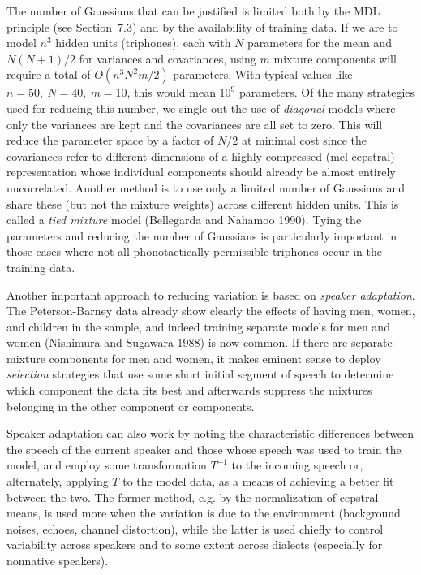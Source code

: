 The number of Gaussians that can be justified is limited both by the MDL
principle (see Section~7.3) and by the availability of training data. If we
are to model $n^3$ hidden units (triphones), each with $N$ parameters for the
mean and $N(N+1)/2$ for variances and covariances, using $m$ mixture
components will require a total of $O(n^3N^2m/2)$ parameters. With typical
values like $n=50,\ N=40,\ m=10$, this would mean $10^9$ parameters. Of the
many strategies used for reducing this number, we single out the use of {\it
  diagonal} models where only the variances are kept and the covariances are
all set to zero. This will reduce the
parameter space by a factor of $N/2$ at minimal cost since the covariances
refer to different dimensions of a highly compressed (mel cepstral)
representation whose individual components should already be almost entirely
uncorrelated. Another method is to use only a limited number of Gaussians and
share these (but not the mixture weights) across different hidden units. This
is called a {\it tied mixture} model (Bellegarda and Nahamoo
1990).\nocite{Bellegarda:1990}
Tying the parameters and reducing the number of Gaussians is particularly
important in those cases where not all phonotactically permissible triphones
occur in the training data.

Another important approach to reducing variation is based on {\it speaker
  adaptation}. The Peterson-Barney data already show clearly the effects of
having men, women, and children in the sample, and indeed training separate
models for men and women (Nishimura and Sugawara 1988) is now
common.\nocite{Nishimura:1988} If there are separate mixture components for
men and women, it makes eminent sense to deploy {\it selection} strategies
that use some short initial segment of speech to determine which component the
data fits best and afterwards suppress the mixtures belonging in the other
component or components. 

Speaker adaptation can also work by noting the characteristic differences
between the speech of the current speaker and those whose speech was used to
train the model, and employ some transformation $T^{-1}$ to the incoming
speech or, alternately, applying $T$ to the model data, as a means of
achieving a better fit between the two. The former method, e.g. by the
normalization of cepstral means, is used more when the variation is due to the
environment (background noises, echoes, channel distortion), while the latter
is used chiefly to control variability across speakers and to some extent
across dialects (especially for nonnative speakers).

